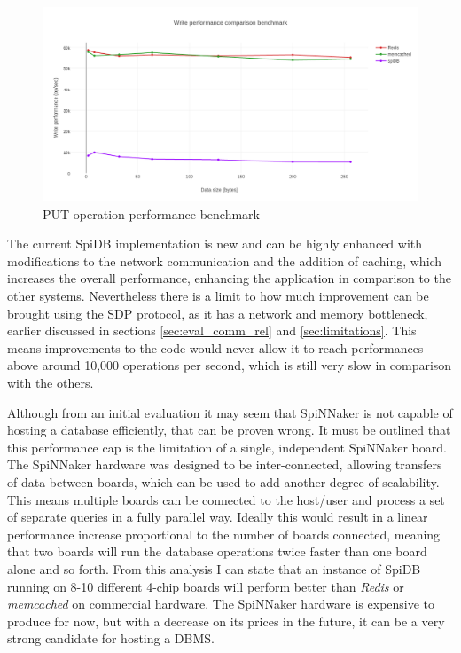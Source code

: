\begin{figure}
\begin{center}
	\includegraphics[width=1.4\textwidth, natwidth=1063, natheight=509]{images/write_performance.png}
\end{center}
\caption{PUT operation performance benchmark}
\label{fig:write-perf-benchmark}
\end{figure}

The current SpiDB implementation is new and can be highly enhanced with modifications to the network communication and the addition of caching, which increases the overall performance, enhancing the application in comparison to the other systems. Nevertheless there is a limit to how much improvement can be brought using the SDP protocol, as it has a network and memory bottleneck, earlier discussed in sections \ref{sec:eval_comm_rel} and \ref{sec:limitations}. This means improvements to the code would never allow it to reach performances above around 10,000 operations per second, which is still very slow in comparison with the others.

Although from an initial evaluation it may seem that SpiNNaker is not capable of hosting a database efficiently, that can be proven wrong. It must be outlined that this performance cap is the limitation of a single, independent SpiNNaker board. The SpiNNaker hardware was designed to be inter-connected, allowing transfers of data between boards, which can be used to add another degree of scalability. This means multiple boards can be connected to the host/user and process a set of separate queries in a fully parallel way. Ideally this would result in a linear performance increase proportional to the number of boards connected, meaning that two boards will run the database operations twice faster than one board alone and so forth. From this analysis I can state that an instance of SpiDB running on 8-10 different 4-chip boards will perform better than \textit{Redis} or \textit{memcached} on commercial hardware. The SpiNNaker hardware is expensive to produce for now, but with a decrease on its prices in the future, it can be a very strong candidate for hosting a DBMS.

